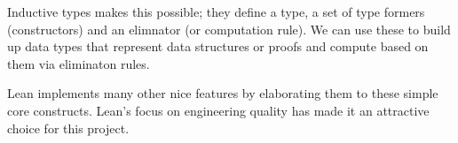 Inductive types makes this possible; they define a type, a set of type formers
(constructors) and an elimnator (or computation rule). We can use these to build
up data types that represent data structures or proofs and compute based on them
via eliminaton rules.

Lean implements many other nice features by elaborating them to these simple
core constructs. Lean's focus on engineering quality has made it an attractive
choice for this project.

